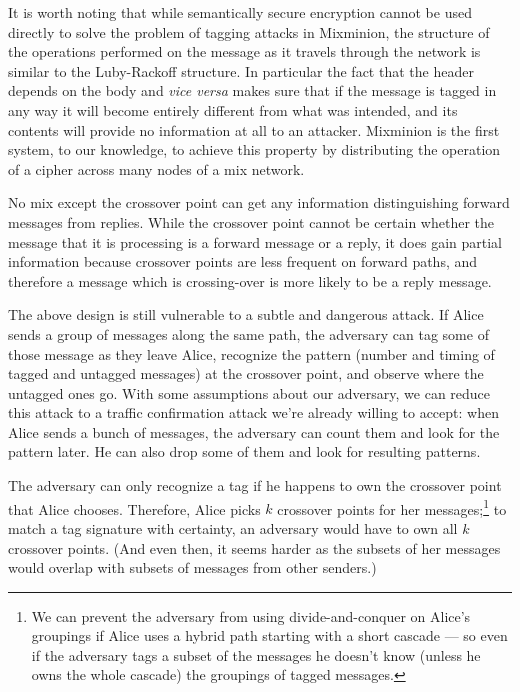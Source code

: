 \documentclass[times,10pt,twocolumn]{article}
\begin{document}
It is worth noting that while semantically secure encryption cannot be
used directly to solve the problem of tagging attacks in Mixminion, the
structure of the operations performed on the message as it travels
through the network is similar to the Luby-Rackoff \cite{sprp}
structure. In particular the fact that the header depends on the body
and \emph{vice versa} makes sure that if the message is tagged in
any way it will become entirely different from what was intended, and
its contents
will provide no information at all to an attacker. Mixminion is the
first system, to our knowledge, to achieve this property by
distributing the operation of a cipher across many nodes of a mix network.

No mix except the crossover point can get any information distinguishing
forward messages from replies. While the crossover point cannot be
certain whether the message that it is processing is a forward message
or a reply, it does gain partial information because crossover points
are less frequent on forward paths, and therefore a message which is
crossing-over is more likely to be a reply message.

\label{subsec:multi-tagging}

The above design is still vulnerable to a subtle and dangerous
attack. If Alice sends a group of messages along the same path, the
adversary can tag some of those message as they leave Alice, recognize
the pattern (number and timing of tagged and untagged messages) at the
crossover point, and observe where the untagged ones go.
With some assumptions about our adversary, we can reduce
this attack to a traffic confirmation attack we're already willing to
accept: when Alice sends a bunch of messages, the adversary can count
them and look for the pattern later. He can also drop some of them and
look for resulting patterns.

The adversary can only recognize a tag if he happens to own the crossover
point that Alice chooses.
Therefore, Alice picks $k$ crossover points for her
messages;\footnote{
  We can prevent the adversary from using divide-and-conquer on Alice's
  groupings if Alice uses a hybrid path starting with a short cascade ---
  so even if the adversary tags a subset of the messages he doesn't know
  (unless he owns the whole cascade) the groupings of tagged messages.
}
to match a tag signature with certainty, an adversary would
have to own all $k$ crossover points.  (And even then, it seems harder
as the subsets of her messages would overlap with subsets of
messages from other senders.)
\end{document}
